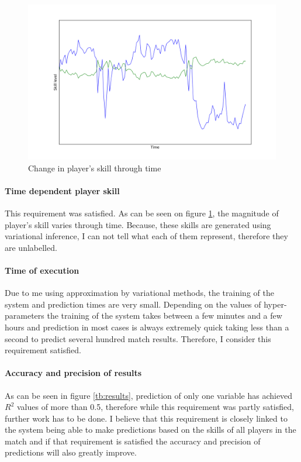 \documentclass[12pt,a4paper]{book}
\begin{document}
\begin{figure}[ht]
\centering
\includegraphics[scale=0.5]{player_skill}
\caption{Change in player's skill through time}
\label{fig:player-skill}
\end{figure}

\paragraph{Time dependent player skill}
This requirement was satisfied.
As can be seen on figure \ref{fig:player-skill}, the magnitude of player's skill varies through time.
Because, these skills are generated using variational inference, I can not tell what each of them represent, therefore they are unlabelled.

\paragraph{Time of execution}
Due to me using approximation by variational methods, the training of the system and prediction times are very small.
Depending on the values of hyper-parameters the training of the system takes between a few minutes and a few hours and prediction in most cases is always extremely quick taking less than a second to predict several hundred match results.
Therefore, I consider this requirement satisfied.

\paragraph{Accuracy and precision of results}
As can be seen in figure \ref{tb:results}, prediction of only one variable has achieved $R^2$ values of more than 0.5, therefore while this requirement was partly satisfied, further work has to be done.
I believe that this requirement is closely linked to the system being able to make predictions based on the skills of all players in the match and if that requirement is satisfied the accuracy and precision of predictions will also greatly improve.
\end{document}
